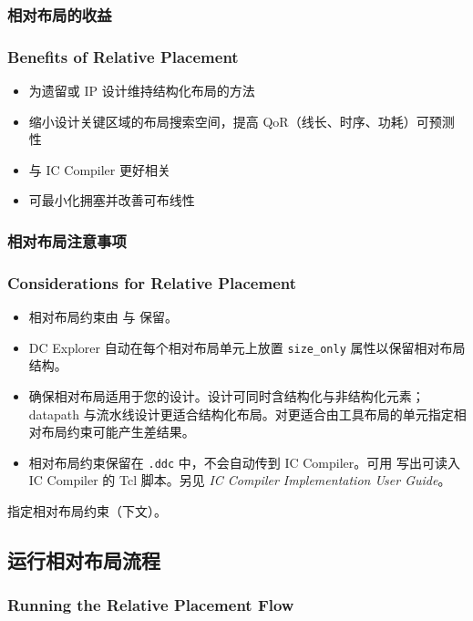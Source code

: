 \subsubsection{相对布局的收益}
\subsubsection*{Benefits of Relative Placement}

\begin{itemize}
  \item 为遗留或 IP 设计维持结构化布局的方法
  \item 缩小设计关键区域的布局搜索空间，提高 QoR（线长、时序、功耗）可预测性
  \item 与 IC Compiler 更好相关
  \item 可最小化拥塞并改善可布线性
\end{itemize}

\subsubsection{相对布局注意事项}
\subsubsection*{Considerations for Relative Placement}

\begin{itemize}
  \item 相对布局约束由  与  保留。
  \item DC Explorer 自动在每个相对布局单元上放置 \texttt{size\_only} 属性以保留相对布局结构。
  \item 确保相对布局适用于您的设计。设计可同时含结构化与非结构化元素；datapath 与流水线设计更适合结构化布局。对更适合由工具布局的单元指定相对布局约束可能产生差结果。
  \item 相对布局约束保留在 \texttt{.ddc} 中，不会自动传到 IC Compiler。可用  写出可读入 IC Compiler 的 Tcl 脚本。另见 \textit{IC Compiler Implementation User Guide}。
\end{itemize}

\begin{seeAlsoBox}
指定相对布局约束（下文）。
\end{seeAlsoBox}

\subsection{运行相对布局流程}
\subsubsection*{Running the Relative Placement Flow}

